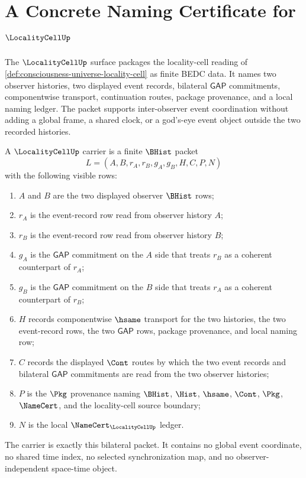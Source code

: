 \chapter{A Concrete Naming Certificate for $\LocalityCellUp$}
\label{ch:concrete-instances-localitycell-namecert}

The $\LocalityCellUp$ surface packages the locality-cell reading of \autoref{def:consciousness-universe-locality-cell} as finite BEDC data. It names two observer histories, two displayed event records, bilateral $\mathsf{GAP}$ commitments, componentwise transport, continuation routes, package provenance, and a local naming ledger. The packet supports inter-observer event coordination without adding a global frame, a shared clock, or a god's-eye event object outside the two recorded histories.

\begin{definition}
\label{def:locality-cell-carrier}
A $\LocalityCellUp$ carrier is a finite $\BHist$ packet
$$
L=(A,B,r_A,r_B,g_A,g_B,H,C,P,N)
$$
with the following visible rows:
\begin{enumerate}
\item $A$ and $B$ are the two displayed observer $\BHist$ rows;
\item $r_A$ is the event-record row read from observer history $A$;
\item $r_B$ is the event-record row read from observer history $B$;
\item $g_A$ is the $\mathsf{GAP}$ commitment on the $A$ side that treats $r_B$ as a coherent counterpart of $r_A$;
\item $g_B$ is the $\mathsf{GAP}$ commitment on the $B$ side that treats $r_A$ as a coherent counterpart of $r_B$;
\item $H$ records componentwise $\hsame$ transport for the two histories, the two event-record rows, the two $\mathsf{GAP}$ rows, package provenance, and local naming row;
\item $C$ records the displayed $\Cont$ routes by which the two event records and bilateral $\mathsf{GAP}$ commitments are read from the two observer histories;
\item $P$ is the $\Pkg$ provenance naming $\BHist$, $\Hist$, $\hsame$, $\Cont$, $\Pkg$, $\NameCert$, and the locality-cell source boundary;
\item $N$ is the local $\NameCert_{\LocalityCellUp}$ ledger.
\end{enumerate}
The carrier is exactly this bilateral packet. It contains no global event coordinate, no shared time index, no selected synchronization map, and no observer-independent space-time object.
\end{definition}


